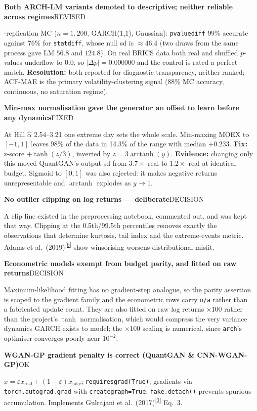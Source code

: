 \documentclass[11pt,a4paper]{article}
\makeatletter
\newcommand{\tcite}[1]{\textsuperscript{[\hyperlink{R:#1}{#1}]}}
\DeclareRobustCommand{\_}{\ifmmode\nfss@text{\textunderscore}\else\textunderscore\allowbreak\fi}
\newcommand{\auditrow}[5]{\par\medskip\noindent\textbf{#4}\hfill{\sffamily\footnotesize\textsc{#1}}\par\nopagebreak\noindent #5\par}
\makeatother
\begin{document}
\auditrow{REVISED}{Amber}{ABg}%
  {Both ARCH-LM variants demoted to descriptive; neither reliable across regimes}%
  {80-replication MC ($n=1{,}200$, GARCH(1,1), Gaussian): \texttt{pvalue\_diff} $99\%$ accurate against $76\%$ for \texttt{stat\_diff}, whose null sd is $\approx46.4$ (two draws from the same process gave LM $56.8$ and $124.8$). On real BRICS data both real and shuffled $p$-values underflow to $0.0$, so $|\Delta p| = 0.000000$ and the control is rated a perfect match. \textbf{Resolution:} both reported for diagnostic transparency, neither ranked; ACF-MAE is the primary volatility-clustering signal ($88\%$ MC accuracy, continuous, no saturation regime).}

\auditrow{FIXED}{Amber}{ABg}%
  {Min-max normalisation gave the generator an offset to learn before any dynamics}%
  {At Hill $\hat\alpha$ 2.54--3.21 one extreme day sets the whole scale. Min-maxing MOEX to $[-1,1]$ leaves $98\%$ of the data in 14.3\% of the range with median \(+0.233\). \textbf{Fix:} z-score $+\tanh(z/3)$, inverted by $z=3\operatorname{arctanh}(y)$. \textbf{Evidence:} changing only this moved QuantGAN's output sd from $3.7\times$ real to $1.2\times$ real at identical budget. Sigmoid to $[0,1]$ was also rejected: it makes negative returns unrepresentable and $\operatorname{arctanh}$ explodes as $y\to1$.}

\auditrow{DECISION}{Indigo}{IBg}%
  {No outlier clipping on log returns --- deliberate}%
  {A clip line existed in the preprocessing notebook, commented out, and was kept that way. Clipping at the 0.5th/99.5th percentiles removes exactly the observations that determine kurtosis, tail index and the extreme-events metric. Adams et al.\ (2019)\tcite{6} show winsorising worsens distributional misfit.}

\auditrow{DECISION}{Indigo}{IBg}%
  {Econometric models exempt from budget parity, and fitted on raw returns}%
  {Maximum-likelihood fitting has no gradient-step analogue, so the parity assertion is scoped to the gradient family and the econometric rows carry \texttt{n/a} rather than a fabricated update count. They are also fitted on raw log returns $\times100$ rather than the project's $\tanh$ normalisation, which would compress the very variance dynamics GARCH exists to model; the $\times100$ scaling is numerical, since \texttt{arch}'s optimiser converges poorly near $10^{-2}$.}

\auditrow{OK}{FGreen}{GBg}%
  {WGAN-GP gradient penalty is correct (QuantGAN \& CNN-WGAN-GP)}%
  {$\hat x = \varepsilon x_\text{real} + (1-\varepsilon)x_\text{fake}$; \texttt{requires\_grad\_(True)}; gradients via \texttt{torch.autograd.grad} with \texttt{create\_graph=True}; \texttt{fake.detach()} prevents spurious accumulation. Implements Gulrajani et al.\ (2017)\tcite{3} Eq.~3.}
\end{document}

